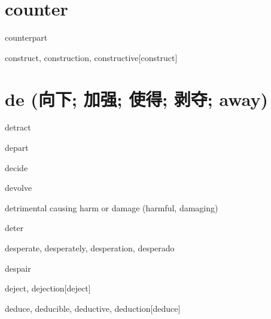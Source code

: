 \section{counter}

\begin{RefWord}{counterpart}
\end{RefWord}

\begin{RefWord}{construct, construction, constructive}[construct]
\end{RefWord}



\section{de (向下; 加强; 使得; 剥夺; away)}

\begin{RefWord}{detract}
\end{RefWord}

\begin{RefWord}{depart}
\end{RefWord}

\begin{RefWord}{decide}
\end{RefWord}

\begin{RefWord}{devolve}
\end{RefWord}

\begin{RefWord}{detrimental}
    causing harm or damage (harmful, damaging)
\end{RefWord}

\begin{RefWord}{deter}
\end{RefWord}

\begin{RefWord}{desperate, desperately, desperation, desperado}
\end{RefWord}

\begin{RefWord}{despair}
\end{RefWord}

\begin{RefWord}{deject, dejection}[deject]
\end{RefWord}

\begin{RefWord}{deduce, deducible, deductive, deduction}[deduce]
\end{RefWord}

